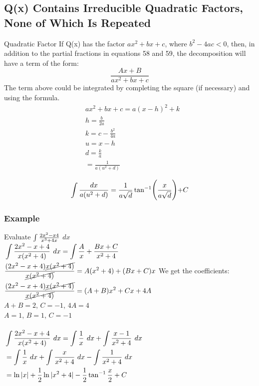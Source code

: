 \documentclass[letterpaper,10pt,twoside,twocolumn,openany]{book}
\begin{document}
\subsection{Q(x) Contains Irreducible Quadratic Factors, None of Which Is Repeated}
\begin{paperbox}{Quadratic Factor}
    If Q(x) has the factor $ ax^2 + bx + c$, where $b^2 - 4ac < 0$, then, in addition to the partial fractions in equations 58 and 59, the decomposition will have a term of the form:
    \begin{equation}
        \frac{Ax+B}{ax^2 + bx + c}
    \end{equation} 
    The term above could be integrated by completing the square (if necessary) and using the formula.
    $$\begin{aligned}
        &ax^2 + bx + c = a(x - h)^2 + k\\
        &h = \frac{b}{2a}\\
        &k = c - \frac{b^2}{4a}\\
        &u = x - h\\
        &d = \frac{k}{a}\\
        &= \frac{1}{a(u^2+d)}\\
    \end{aligned}$$
    \begin{equation}
        \large\int \frac{dx}{a(u^2 + d)} = \frac{1}{a\sqrt{d}}\tan^{-1}\biggl(\frac{x}{a\sqrt{d}}\biggl) + C
    \end{equation}
\end{paperbox}
\subsubsection{Example}
Evaluate \LARGE$\large\int \frac{2x^2 - x 4}{x^3 + 4x}$ \normalsize$dx$\\
$\begin{aligned}
    &\large\int \frac{2x^2 - x + 4}{x(x^2 + 4)}\ dx = \int \frac{A}{x} + \frac{Bx + C}{x^2 + 4}\\
    &\frac{(2x^2 - x + 4)\cancel{x(x^2 + 4)}}{\cancel{x(x^2 + 4)}} = A(x^2 + 4) + (Bx + C)x\\
    &\frac{(2x^2 - x + 4)\cancel{x(x^2 + 4)}}{\cancel{x(x^2 + 4)}} = (A + B)x^2 + Cx + 4A\\
\end{aligned}$
We get the coefficients: $A + B = 2$, $C = -1$, $4A = 4$\\
$A = 1$, $B = 1$, $C = -1$
\\~\\
$\begin{aligned}
    &\large\int \frac{2x^2 - x + 4}{x(x^2 + 4)}\ dx = \int \frac{1}{x}\ dx+ \int \frac{x - 1}{x^2 + 4}\ dx\\
    &=  \int \frac{1}{x}\ dx + \int \frac{x}{x^2 + 4}\ dx - \int \frac{1}{x^2 + 4}\ dx\\
    &= \ln{|x|} + \frac{1}{2}\ln{|x^2 + 4|} - \frac{1}{2} \tan^{-1}{\frac{x}{2}} + C
\end{aligned}$
\newpage
\end{document}

